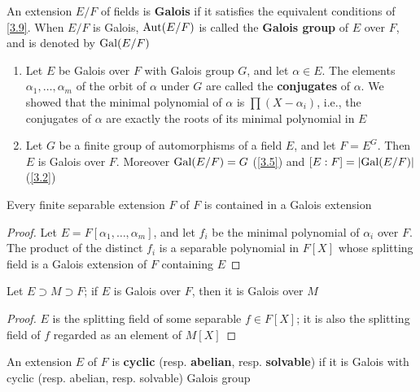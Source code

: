 \documentclass[11pt]{article}
\begin{document}
\begin{definition}[]
An extension \(E/F\) of fields is \textbf{Galois} if it satisfies the equivalent conditions of \ref{3.9}.
When \(E/F\) is Galois, \(\operatorname{\text{Aut}}(E/F)\) is called the \textbf{Galois group} of \(E\) over \(F\), and is
denoted by \(\operatorname{Gal}(E/F)\)
\end{definition}

\begin{remark}
\label{3.11}
\begin{enumerate}
\item Let \(E\) be Galois over \(F\) with Galois group \(G\), and let \(\alpha\in E\). The
elements \(\alpha_1,\dots,\alpha_m\) of the orbit of \(\alpha\) under \(G\) are called the \textbf{conjugates} of \(\alpha\). We showed
that the minimal polynomial of \(\alpha\) is \(\prod(X-\alpha_i)\), i.e., the conjugates of \(\alpha\) are exactly the
roots of its minimal polynomial in \(E\)
\item Let \(G\) be a finite group of automorphisms of a field \(E\), and let \(F=E^G\). Then \(E\)
is Galois over \(F\). Moreover \(\operatorname{Gal}(E/F)=G\) (\ref{3.5}) and \([E:F]=\abs{\Gal(E/F)}\) (\ref{3.2})
\end{enumerate}
\end{remark}

\begin{corollary}[]
\label{3.12}
Every finite separable extension \(F\) of \(F\) is contained in a Galois extension
\end{corollary}

\begin{proof}
Let \(E=F[\alpha_1,\dots,\alpha_m]\), and let \(f_i\) be the minimal polynomial of \(\alpha_i\) over \(F\). The
product of the distinct \(f_i\) is a separable polynomial in \(F[X]\) whose splitting field is a
Galois extension of \(F\) containing \(E\)
\end{proof}

\begin{corollary}[]
\label{3.13}
Let \(E\supset M\supset F\); if \(E\) is Galois over \(F\), then it is Galois over \(M\)
\end{corollary}

\begin{proof}
\(E\) is the splitting field of some separable \(f\in F[X]\); it is also the splitting field
of \(f\) regarded as an element of \(M[X]\)
\end{proof}

\begin{definition}[]
An extension \(E\) of \(F\) is \textbf{cyclic} (resp. \textbf{abelian}, resp. \textbf{solvable}) if it is Galois with
cyclic (resp. abelian, resp. solvable) Galois group
\end{definition}
\end{document}
